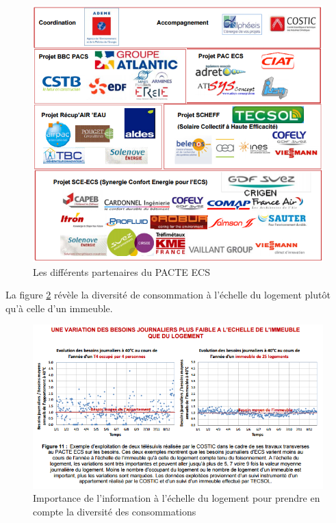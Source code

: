 \begin{figure}[H]
\centering
\includegraphics[scale=0.8]{Images/PACTEECS}
\caption{Les différents partenaires du PACTE ECS}
\label{fig:PACTEECS}
\end{figure}

La figure \ref{fig:Foisonnement_ECS} révèle la diversité de consommation à l'échelle du logement plutôt qu'à celle d'un immeuble.

\begin{figure}[H]
\centering
\includegraphics[scale=0.9]{Images/Foisonnement_ECS}
\caption{Importance de l'information à l'échelle du logement pour prendre en compte la diversité des consommations}
\label{fig:Foisonnement_ECS}
\end{figure}

